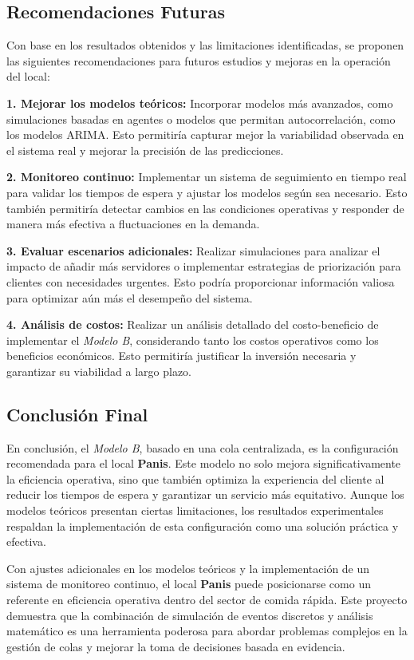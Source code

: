 \documentclass[a4paper,12pt]{article}
\begin{document}
\subsection{Recomendaciones Futuras}

Con base en los resultados obtenidos y las limitaciones identificadas, se proponen las siguientes recomendaciones para futuros estudios y mejoras en la operación del local:

\textbf{1. Mejorar los modelos teóricos:} Incorporar modelos más avanzados, como simulaciones basadas en agentes o modelos que permitan autocorrelación, como los modelos ARIMA. Esto permitiría capturar mejor la variabilidad observada en el sistema real y mejorar la precisión de las predicciones.

\textbf{2. Monitoreo continuo:} Implementar un sistema de seguimiento en tiempo real para validar los tiempos de espera y ajustar los modelos según sea necesario. Esto también permitiría detectar cambios en las condiciones operativas y responder de manera más efectiva a fluctuaciones en la demanda.

\textbf{3. Evaluar escenarios adicionales:} Realizar simulaciones para analizar el impacto de añadir más servidores o implementar estrategias de priorización para clientes con necesidades urgentes. Esto podría proporcionar información valiosa para optimizar aún más el desempeño del sistema.

\textbf{4. Análisis de costos:} Realizar un análisis detallado del costo-beneficio de implementar el \textit{Modelo B}, considerando tanto los costos operativos como los beneficios económicos. Esto permitiría justificar la inversión necesaria y garantizar su viabilidad a largo plazo.

\subsection{Conclusión Final}

En conclusión, el \textit{Modelo B}, basado en una cola centralizada, es la configuración recomendada para el local \textbf{Panis}. Este modelo no solo mejora significativamente la eficiencia operativa, sino que también optimiza la experiencia del cliente al reducir los tiempos de espera y garantizar un servicio más equitativo. Aunque los modelos teóricos presentan ciertas limitaciones, los resultados experimentales respaldan la implementación de esta configuración como una solución práctica y efectiva.

Con ajustes adicionales en los modelos teóricos y la implementación de un sistema de monitoreo continuo, el local \textbf{Panis} puede posicionarse como un referente en eficiencia operativa dentro del sector de comida rápida. Este proyecto demuestra que la combinación de simulación de eventos discretos y análisis matemático es una herramienta poderosa para abordar problemas complejos en la gestión de colas y mejorar la toma de decisiones basada en evidencia.
\end{document}
